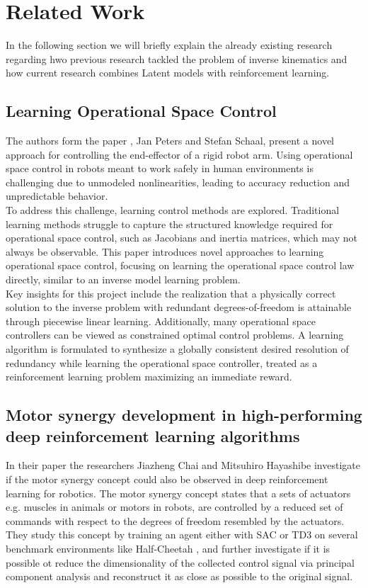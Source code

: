 \chapter{Related Work}\label{chap:relatedwork}

In the following section we will briefly explain the already existing research regarding hwo previous research tackled the problem of inverse kinematics and how current research combines Latent models with reinforcement learning.

\section{Learning Operational Space Control}

The authors form the paper \cite{Learning_to_Control_in_Operational_Space}, Jan Peters and Stefan Schaal, present a novel approach for controlling the end-effector of a rigid robot arm. Using operational space control in robots meant to work safely in human environments is challenging due to unmodeled nonlinearities, leading to accuracy reduction and unpredictable behavior.\\
To address this challenge, learning control methods are explored. Traditional learning methods struggle to capture the structured knowledge required for operational space control, such as Jacobians and inertia matrices, which may not always be observable. This paper introduces novel approaches to learning operational space control, focusing on learning the operational space control law directly, similar to an inverse model learning problem. \\
Key insights for this project include the realization that a physically correct solution to the inverse problem with redundant degrees-of-freedom is attainable through piecewise linear learning. Additionally, many operational space controllers can be viewed as constrained optimal control problems. A learning algorithm is formulated to synthesize a globally consistent desired resolution of redundancy while learning the operational space controller, treated as a reinforcement learning problem maximizing an immediate reward.

\section{Motor synergy development in high-performing deep reinforcement learning algorithms}

In their paper \cite{Motor_Synergy_Learning} the researchers Jiazheng Chai and  Mitsuhiro Hayashibe investigate if the motor synergy concept could also be observed in deep reinforcement learning for robotics. The motor synergy concept states that a sets of actuators e.g. muscles in animals or motors in robots, are controlled by a reduced set of commands with respect to the degrees of freedom resembled by the actuators. They study this concept by training an agent either with SAC or TD3 on several benchmark environments like Half-Cheetah \cite{Half_Cheetah}, and further investigate if it is possible ot reduce the dimensionality of the collected control signal via principal component analysis \cite{PCA} and reconstruct it as close as possible to the original signal.


